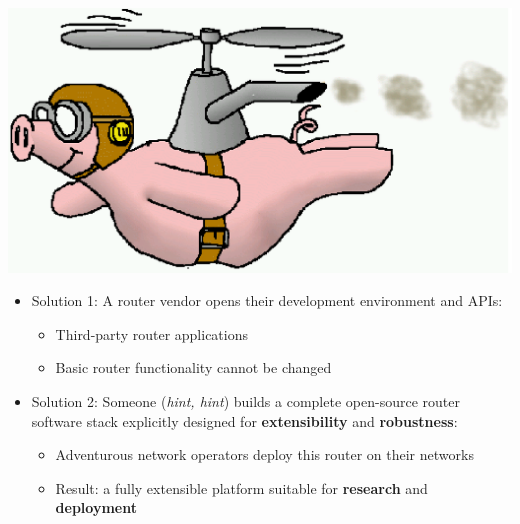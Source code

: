 \documentclass[landscape]{icsislides}
\begin{document}
\begin{slide}

\begin{center}
  \includegraphics[width=6.0in]{figs/flyingpig}
\end{center}

\end{slide}

\begin{slide}

\begin{itemize}

  \item Solution 1: A router vendor opens their development environment and
  APIs:
  \begin{itemize}
    \item Third-party router applications
    \item Basic router functionality cannot be changed
  \end{itemize}

  \item Solution 2: Someone (\emph{hint, hint}) builds a complete open-source
  router software stack explicitly designed for {\bf extensibility} and
  {\bf robustness}:
  \begin{itemize}
    \item Adventurous network operators deploy this router on their
    networks
    \item Result: a fully extensible platform suitable for {\bf research} and
    {\bf deployment}
  \end{itemize}
\end{itemize}

\end{slide}
\end{document}
